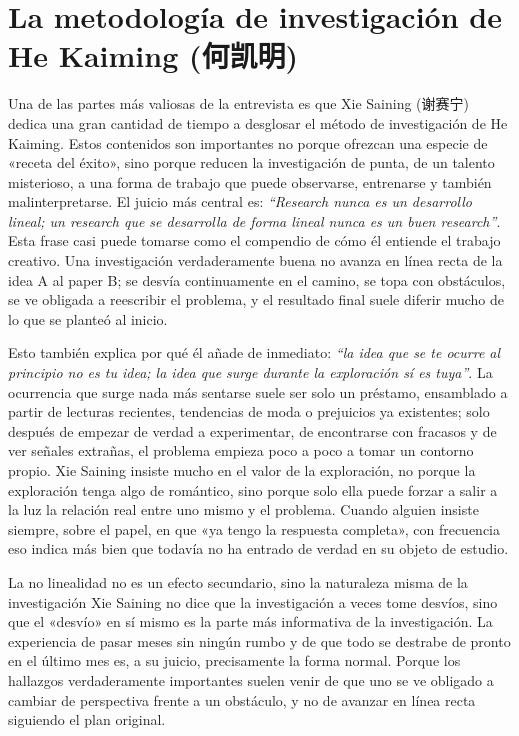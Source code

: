 \section{La metodología de investigación de He Kaiming (何凯明)}

Una de las partes más valiosas de la entrevista es que Xie Saining (谢赛宁) dedica una gran cantidad de tiempo a desglosar el método de investigación de He Kaiming. Estos contenidos son importantes no porque ofrezcan una especie de «receta del éxito», sino porque reducen la investigación de punta, de un talento misterioso, a una forma de trabajo que puede observarse, entrenarse y también malinterpretarse. El juicio más central es: \textit{``Research nunca es un desarrollo lineal; un research que se desarrolla de forma lineal nunca es un buen research''}. Esta frase casi puede tomarse como el compendio de cómo él entiende el trabajo creativo. Una investigación verdaderamente buena no avanza en línea recta de la idea A al paper B; se desvía continuamente en el camino, se topa con obstáculos, se ve obligada a reescribir el problema, y el resultado final suele diferir mucho de lo que se planteó al inicio.

Esto también explica por qué él añade de inmediato: \textit{``la idea que se te ocurre al principio no es tu idea; la idea que surge durante la exploración sí es tuya''}. La ocurrencia que surge nada más sentarse suele ser solo un préstamo, ensamblado a partir de lecturas recientes, tendencias de moda o prejuicios ya existentes; solo después de empezar de verdad a experimentar, de encontrarse con fracasos y de ver señales extrañas, el problema empieza poco a poco a tomar un contorno propio. Xie Saining insiste mucho en el valor de la exploración, no porque la exploración tenga algo de romántico, sino porque solo ella puede forzar a salir a la luz la relación real entre uno mismo y el problema. Cuando alguien insiste siempre, sobre el papel, en que «ya tengo la respuesta completa», con frecuencia eso indica más bien que todavía no ha entrado de verdad en su objeto de estudio.

\begin{importantbox}{La no linealidad no es un efecto secundario, sino la naturaleza misma de la investigación}
Xie Saining no dice que la investigación a veces tome desvíos, sino que el «desvío» en sí mismo es la parte más informativa de la investigación. La experiencia de pasar meses sin ningún rumbo y de que todo se destrabe de pronto en el último mes es, a su juicio, precisamente la forma normal. Porque los hallazgos verdaderamente importantes suelen venir de que uno se ve obligado a cambiar de perspectiva frente a un obstáculo, y no de avanzar en línea recta siguiendo el plan original.
\end{importantbox}

